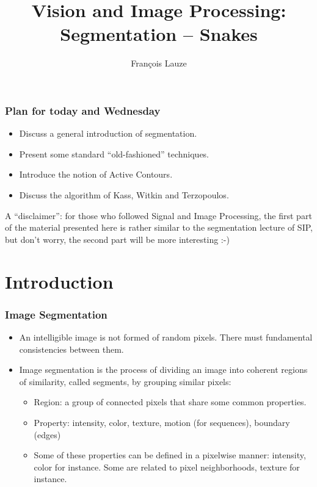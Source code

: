 \documentclass[10pt]{beamer}
\title{Vision and Image Processing: Segmentation -- Snakes}
\author[F.~Lauze] %
{Fran{\c c}ois Lauze}
\institute[DIKU] %
{
  Department of Computer Science\\
  University of Copenhagen
}
\date[2013 B2] %
\begin{document}
\maketitle








\begin{frame}
  \frametitle{Plan for today and Wednesday}
  \begin{itemize}
  \item Discuss a general introduction of segmentation.\vfill
  \item Present some standard ``old-fashioned'' techniques.\vfill
  \item Introduce the notion of Active Contours.\vfill
  \item Discuss the algorithm of Kass, Witkin and Terzopoulos.\vfill
  \end{itemize}
  A ``disclaimer'': for those who followed Signal and Image
  Processing, the first part of the material presented here is rather
  similar to the segmentation lecture of SIP, but don't worry, the
  second part will be more interesting :-)
\end{frame}

\section{Introduction}

\begin{frame}
  \frametitle{Image Segmentation}
  \begin{itemize}
  \item An intelligible image is not formed of random pixels. There must fundamental consistencies between them.\vfill
  \item Image segmentation is the process of dividing an image into
    coherent regions of similarity, called segments, by grouping similar pixels:\vfill
    \begin{itemize}
    \item Region:  a group of connected pixels that share some common properties.\vfill
    \item Property: intensity, color, texture, motion (for sequences), boundary (edges)\vfill
    \item Some of these properties can be defined in a pixelwise manner: intensity, color for instance. 
      Some are related to pixel neighborhoods, texture for instance.\vfill
    \end{itemize}
 \end{itemize}
\end{frame}
\end{document}
